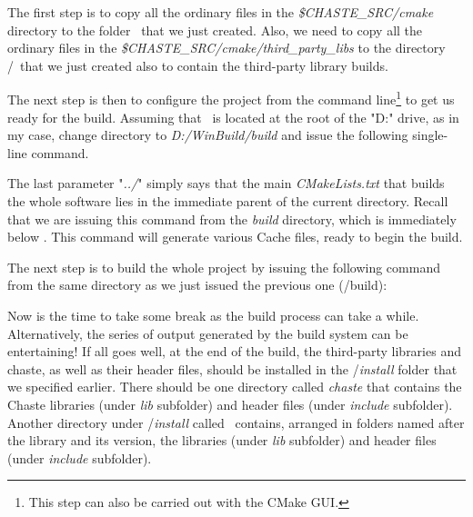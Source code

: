 \documentclass[10pt,a4paper]{article}
\begin{document}
The first step is to copy all the ordinary files in the
\textit{\$CHASTE\_SRC/cmake} directory to the folder \winbuild\ that we just
created. Also, we need to copy all the ordinary files in the 
\textit{\$CHASTE\_SRC/cmake/third\_party\_libs} to the directory
\winbuild/\thirdp\ that we just created also to contain the third-party library
builds.

The next step is then to configure the project from the command
line\footnote{This step can also be carried out with the CMake GUI.} to get us
ready for the build. Assuming that \winbuild\ is located at the root of the "D:"
drive, as in my case, change directory to \textit{D:/WinBuild/build} and issue
the following single-line command.


The last parameter "\textit{../}" simply says that the main
\textit{CMakeLists.txt} that builds the whole software lies in the immediate
parent of the current directory. Recall that we are issuing this command from
the \textit{build} directory, which is immediately below \winbuild. This command
will generate various Cache files, ready to begin the build.

The next step is to build the whole project by issuing the following command
from the same directory as we just issued the previous one (\winbuild/build):

\begin{center}
\end{center}


Now is the time to take some break as the build process can take a while.
Alternatively, the series of output generated by the build system can be
entertaining! If all goes well, at the end of the build, the third-party
libraries and chaste, as well as their header files, should be installed in the
\winbuild/\textit{install} folder that we specified earlier.  There should be
one directory called \textit{chaste} that contains the Chaste libraries (under
\textit{lib} subfolder) and header files (under \textit{include} subfolder).
Another directory under \winbuild/\textit{install} called \thirdp\ contains,
arranged in folders named after the library and its version, the libraries
(under \textit{lib} subfolder) and header files (under \textit{include}
subfolder).
\end{document}
